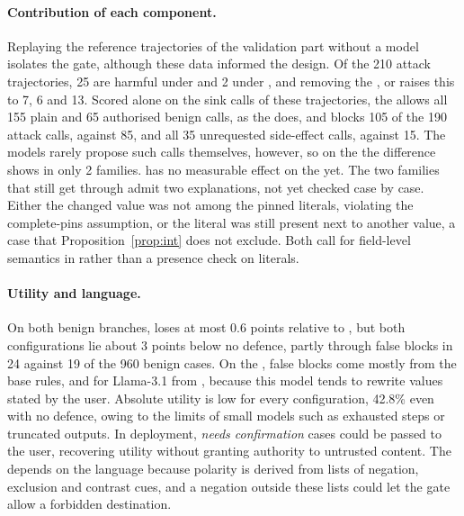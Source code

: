 \paragraph{Contribution of each component.} Replaying the reference trajectories of the validation part without a model
isolates the gate, although these data informed the design. Of the 210 attack trajectories, 25 are harmful under
\strSand{} and 2 under \ours, and removing the \pOne, \pTwo{} or \pThree{} raises this to 7, 6 and 13. Scored alone on
the sink calls of these trajectories, the \pOne{} allows all 155 plain and 65 authorised benign calls, as the \rDest{}
does, and blocks 105 of the 190 attack calls, against 85, and all 35 unrequested side-effect calls, against 15. The
models rarely propose such calls themselves, however, so on the \test{} the difference shows in only 2 families.
\PThree{} has no measurable effect on the \test{} yet. The two families that still get through admit two explanations,
not yet checked case by case. Either the changed value was not among the pinned literals, violating the complete-pins
assumption, or the literal was still present next to another value, a case that Proposition~\ref{prop:int} does not
exclude. Both call for field-level semantics in \pThree{} rather than a presence check on literals.

\paragraph{Utility and language.} On both benign branches, \ours{} loses at most 0.6 points relative to \strSand, but
both configurations lie about 3 points below no defence, partly through false blocks in 24 against 19 of the 960 benign
cases. On the \dev, false blocks come mostly from the base rules, and for Llama-3.1 from \pThree, because this model
tends to rewrite values stated by the user. Absolute utility is low for every configuration, 42.8\% even with no
defence, owing to the limits of small models such as exhausted steps or truncated outputs. In deployment, \emph{needs
confirmation} cases could be passed to the user, recovering utility without granting authority to untrusted content. The
\pOne{} depends on the language because polarity is derived from lists of negation, exclusion and contrast cues, and a
negation outside these lists could let the gate allow a forbidden destination.

